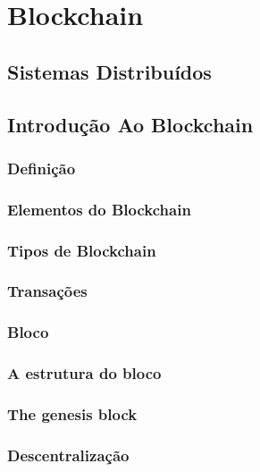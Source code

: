 \section{Blockchain}

\subsection[]{Sistemas Distribuídos}


\subsection[]{Introdução Ao Blockchain}

    \subsubsection{Definição}

    \subsubsection{Elementos do Blockchain}

    \subsubsection{Tipos de Blockchain}

    \subsubsection{Transações}

    \subsubsection{Bloco}

        \subsubsection{A estrutura do bloco}

        \subsubsection{The genesis block}
    
    \subsubsection{Descentralização}

